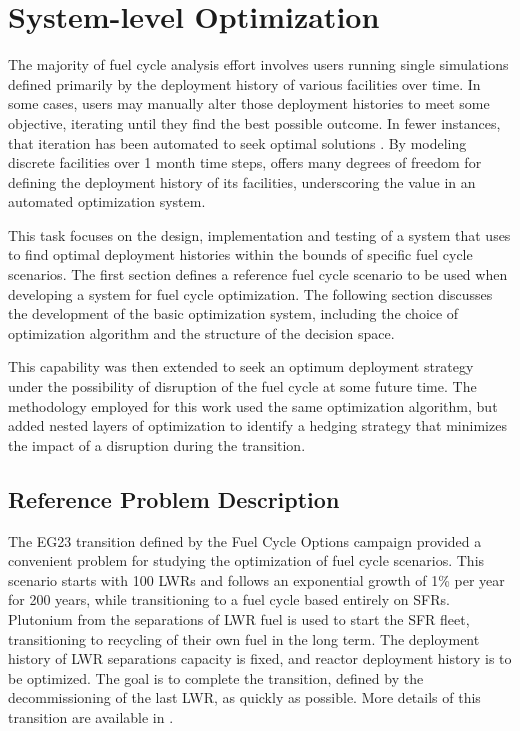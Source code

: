 \section{System-level Optimization}\label{section:system}

The majority of fuel cycle analysis effort involves users running single
simulations defined primarily by the deployment history of various facilities
over time.  In some cases, users may manually alter those deployment histories
to meet some objective, iterating until they find the best possible outcome.
In fewer instances, that iteration has been automated to seek optimal
solutions \cite{hays}.  By modeling discrete facilities over 1 month time
steps, \Cyclus{} offers many degrees of freedom for defining the deployment
history of its facilities, underscoring the value in an automated optimization
system.

This task focuses on the design, implementation and testing of a system that
uses \Cyclus{} to find optimal deployment histories within the bounds of
specific fuel cycle scenarios.  The first section defines a reference fuel
cycle scenario to be used when developing a system for fuel cycle
optimization.  The following section discusses the development of the basic
optimization system, including the choice of optimization algorithm and the
structure of the decision space.

This capability was then extended to seek an optimum deployment strategy under
the possibility of disruption of the fuel cycle at some future time.  The
methodology employed for this work used the same optimization algorithm, but
added nested layers of optimization to identify a hedging strategy that
minimizes the impact of a disruption during the transition.

\subsection{Reference Problem Description}

The EG23 transition defined by the Fuel Cycle Options campaign provided a
convenient problem for studying the optimization of fuel cycle scenarios.
This scenario starts with 100 \gls{LWR}s and follows an exponential growth of
  1\% per year for 200 years, while transitioning to a fuel cycle based
  entirely on \gls{SFR}s.  Plutonium from the separations of \gls{LWR} fuel is
  used to start the \gls{SFR} fleet, transitioning to recycling of their own
  fuel in the long term.  The deployment history of \gls{LWR} separations
  capacity is fixed, and reactor deployment history is to be optimized.  The
  goal is to complete the transition, defined by the decommissioning of the
  last \gls{LWR}, as quickly as possible.  More details of this transition are
  available in \cite{rwc_fff}.


